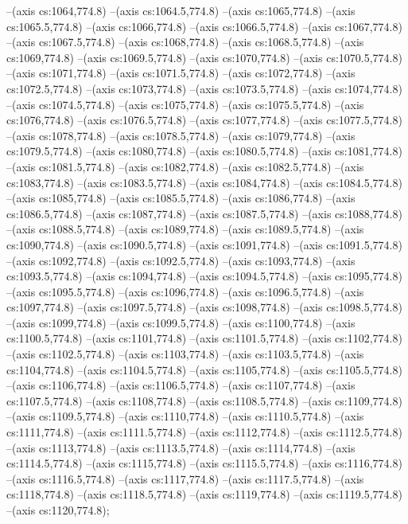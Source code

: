 --(axis cs:1064,774.8)
--(axis cs:1064.5,774.8)
--(axis cs:1065,774.8)
--(axis cs:1065.5,774.8)
--(axis cs:1066,774.8)
--(axis cs:1066.5,774.8)
--(axis cs:1067,774.8)
--(axis cs:1067.5,774.8)
--(axis cs:1068,774.8)
--(axis cs:1068.5,774.8)
--(axis cs:1069,774.8)
--(axis cs:1069.5,774.8)
--(axis cs:1070,774.8)
--(axis cs:1070.5,774.8)
--(axis cs:1071,774.8)
--(axis cs:1071.5,774.8)
--(axis cs:1072,774.8)
--(axis cs:1072.5,774.8)
--(axis cs:1073,774.8)
--(axis cs:1073.5,774.8)
--(axis cs:1074,774.8)
--(axis cs:1074.5,774.8)
--(axis cs:1075,774.8)
--(axis cs:1075.5,774.8)
--(axis cs:1076,774.8)
--(axis cs:1076.5,774.8)
--(axis cs:1077,774.8)
--(axis cs:1077.5,774.8)
--(axis cs:1078,774.8)
--(axis cs:1078.5,774.8)
--(axis cs:1079,774.8)
--(axis cs:1079.5,774.8)
--(axis cs:1080,774.8)
--(axis cs:1080.5,774.8)
--(axis cs:1081,774.8)
--(axis cs:1081.5,774.8)
--(axis cs:1082,774.8)
--(axis cs:1082.5,774.8)
--(axis cs:1083,774.8)
--(axis cs:1083.5,774.8)
--(axis cs:1084,774.8)
--(axis cs:1084.5,774.8)
--(axis cs:1085,774.8)
--(axis cs:1085.5,774.8)
--(axis cs:1086,774.8)
--(axis cs:1086.5,774.8)
--(axis cs:1087,774.8)
--(axis cs:1087.5,774.8)
--(axis cs:1088,774.8)
--(axis cs:1088.5,774.8)
--(axis cs:1089,774.8)
--(axis cs:1089.5,774.8)
--(axis cs:1090,774.8)
--(axis cs:1090.5,774.8)
--(axis cs:1091,774.8)
--(axis cs:1091.5,774.8)
--(axis cs:1092,774.8)
--(axis cs:1092.5,774.8)
--(axis cs:1093,774.8)
--(axis cs:1093.5,774.8)
--(axis cs:1094,774.8)
--(axis cs:1094.5,774.8)
--(axis cs:1095,774.8)
--(axis cs:1095.5,774.8)
--(axis cs:1096,774.8)
--(axis cs:1096.5,774.8)
--(axis cs:1097,774.8)
--(axis cs:1097.5,774.8)
--(axis cs:1098,774.8)
--(axis cs:1098.5,774.8)
--(axis cs:1099,774.8)
--(axis cs:1099.5,774.8)
--(axis cs:1100,774.8)
--(axis cs:1100.5,774.8)
--(axis cs:1101,774.8)
--(axis cs:1101.5,774.8)
--(axis cs:1102,774.8)
--(axis cs:1102.5,774.8)
--(axis cs:1103,774.8)
--(axis cs:1103.5,774.8)
--(axis cs:1104,774.8)
--(axis cs:1104.5,774.8)
--(axis cs:1105,774.8)
--(axis cs:1105.5,774.8)
--(axis cs:1106,774.8)
--(axis cs:1106.5,774.8)
--(axis cs:1107,774.8)
--(axis cs:1107.5,774.8)
--(axis cs:1108,774.8)
--(axis cs:1108.5,774.8)
--(axis cs:1109,774.8)
--(axis cs:1109.5,774.8)
--(axis cs:1110,774.8)
--(axis cs:1110.5,774.8)
--(axis cs:1111,774.8)
--(axis cs:1111.5,774.8)
--(axis cs:1112,774.8)
--(axis cs:1112.5,774.8)
--(axis cs:1113,774.8)
--(axis cs:1113.5,774.8)
--(axis cs:1114,774.8)
--(axis cs:1114.5,774.8)
--(axis cs:1115,774.8)
--(axis cs:1115.5,774.8)
--(axis cs:1116,774.8)
--(axis cs:1116.5,774.8)
--(axis cs:1117,774.8)
--(axis cs:1117.5,774.8)
--(axis cs:1118,774.8)
--(axis cs:1118.5,774.8)
--(axis cs:1119,774.8)
--(axis cs:1119.5,774.8)
--(axis cs:1120,774.8);


